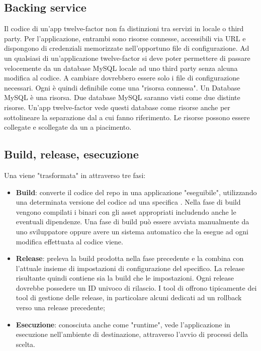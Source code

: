 \documentclass[NormeDiProgetto.tex]{subfiles}
\begin{document}
\subsection{Backing service}
Il codice di un'app twelve-factor non fa distinzioni tra servizi in locale o third party. Per l'applicazione, entrambi sono risorse connesse, accessibili via URL e dispongono di credenziali memorizzate nell'opportuno file di configurazione. Ad un qualsiasi  di un'applicazione twelve-factor si deve poter permettere di passare velocemente da un database MySQL locale ad uno third party senza alcuna modifica al codice. A cambiare dovrebbero essere solo i file di configurazione necessari.
Ogni  è quindi definibile come una "risorsa connessa". Un Database MySQL è una risorsa. Due database MySQL saranno visti come due distinte risorse. Un'app twelve-factor vede questi database come risorse anche per sottolineare la separazione dal  a cui fanno riferimento. Le risorse possono essere collegate e scollegate da un  a piacimento.

\subsection{Build, release, esecuzione}
Una  viene "trasformata" in  attraverso tre fasi:
\begin{itemize}
\item \textbf{Build}: converte il codice del repo in una applicazione "eseguibile", utilizzando una determinata versione del codice ad una specifica . Nella fase di build vengono compilati i binari con gli asset appropriati includendo anche le eventuali dipendenze. Una fase di build può essere avviata manualmente da uno sviluppatore oppure avere un sistema automatico che la esegue ad ogni modifica effettuata al codice viene.
\item \textbf{Release}: preleva la build prodotta nella fase precedente e la combina con l'attuale insieme di impostazioni di configurazione del  specifico. La release risultante quindi contiene sia la build che le impostazioni. Ogni release dovrebbe possedere un ID univoco di rilascio. I tool di  offrono tipicamente dei tool di gestione delle release, in particolare alcuni dedicati ad un rollback verso una release precedente;
\item \textbf{Esecuzione}: conosciuta anche come "runtime", vede l'applicazione in esecuzione nell'ambiente di destinazione, attraverso l'avvio di processi della  scelta.
\end{itemize}
\end{document}
